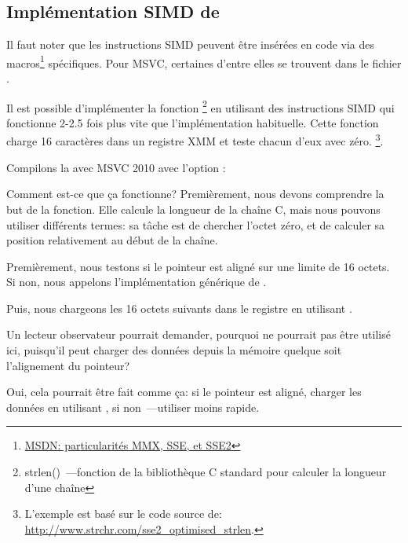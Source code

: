 ﻿\subsection{Implémentation SIMD de \strlen}
\label{SIMD_strlen}

\newcommand{\URLMSDNSSE}{\href{http://msdn.microsoft.com/en-us/library/y0dh78ez(VS.80).aspx}{MSDN: particularités MMX, SSE, et SSE2}}

Il faut noter que les instructions \ac{SIMD} peuvent être insérées en code \CCpp via
des macros\footnote{\URLMSDNSSE} spécifiques.
Pour MSVC, certaines d'entre elles se trouvent dans le fichier .

\newcommand{\URLSTRLEN}{http://www.strchr.com/sse2_optimised_strlen}


Il est possible d'implémenter la fonction \strlen\footnote{strlen()~---fonction de
la bibliothèque C standard pour calculer la longueur d'une chaîne} en utilisant des
instructions SIMD qui fonctionne 2-2.5 fois plus vite que l'implémentation habituelle.
Cette fonction charge 16 caractères dans un registre XMM et teste chacun d'eux avec
zéro.
\footnote{L'exemple est basé sur le code source de: \url{\URLSTRLEN}.}.



Compilons la avec MSVC 2010 avec l'option \Ox:



Comment est-ce que ça fonctionne?
Premièrement, nous devons comprendre la but de la fonction.
Elle calcule la longueur de la chaîne C, mais nous pouvons utiliser différents termes:
sa tâche est de chercher l'octet zéro, et de calculer sa position relativement au
début de la chaîne.

Premièrement, nous testons si le pointeur  est aligné sur une limite de
16 octets.
Si non, nous appelons l'implémentation générique de \strlen.

Puis, nous chargeons les 16 octets suivants dans le registre  en utilisant
\MOVDQA.

Un lecteur observateur pourrait demander, pourquoi \MOVDQU ne pourrait pas être utilisé
ici, puisqu'il peut charger des données depuis la mémoire quelque soit l'alignement
du pointeur?

Oui, cela pourrait être fait comme ça: si le pointeur est aligné, charger les données
en utilisant \MOVDQA, si non~---utiliser \MOVDQU moins rapide.

